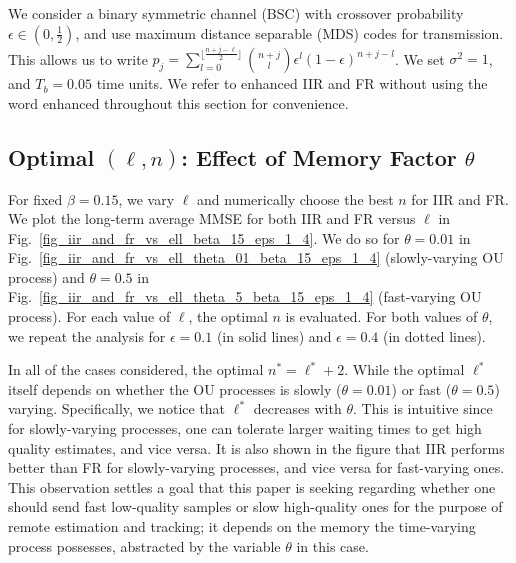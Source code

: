 \documentclass[12pt,journal,onecolumn]{IEEEtran}
\begin{document}
We consider a binary symmetric channel (BSC) with crossover probability $\epsilon\in\left(0,\frac{1}{2}\right)$, and use maximum distance separable (MDS) codes for transmission. This allows us to write $p_j=\sum_{l=0}^{\lfloor\frac{n+j-\ell}{2}\rfloor}\binom{n+j}{l}\epsilon^l(1-\epsilon)^{n+j-l}$. We set $\sigma^2=1$, and $T_b=0.05$ time units. We refer to enhanced IIR and FR without using the word enhanced throughout this section for convenience.


\subsection{Optimal $(\ell,n)$: Effect of Memory Factor $\theta$}

For fixed $\beta=0.15$, we vary $\ell$ and numerically choose the best $n$ for IIR and FR. We plot the long-term average MMSE for both IIR and FR versus $\ell$ in Fig.~\ref{fig_iir_and_fr_vs_ell_beta_15_eps_1_4}. We do so for $\theta=0.01$ in Fig.~\ref{fig_iir_and_fr_vs_ell_theta_01_beta_15_eps_1_4} (slowly-varying OU process) and $\theta=0.5$ in Fig.~\ref{fig_iir_and_fr_vs_ell_theta_5_beta_15_eps_1_4} (fast-varying OU process). For each value of $\ell$, the optimal $n$ is evaluated. For both values of $\theta$, we repeat the analysis for $\epsilon=0.1$ (in solid lines) and $\epsilon=0.4$ (in dotted lines).

In all of the cases considered, the optimal $n^*=\ell^*+2$. While the optimal $\ell^*$ itself depends on whether the OU processes is slowly ($\theta=0.01$) or fast ($\theta=0.5$) varying. Specifically, we notice that $\ell^*$ decreases with $\theta$. This is intuitive since for slowly-varying processes, one can tolerate larger waiting times to get high quality estimates, and vice versa. It is also shown in the figure that IIR performs better than FR for slowly-varying processes, and vice versa for fast-varying ones. This observation settles a goal that this paper is seeking regarding whether one should send fast low-quality samples or slow high-quality ones for the purpose of remote estimation and tracking; it depends on the memory the time-varying process possesses, abstracted by the variable $\theta$ in this case.
\end{document}
